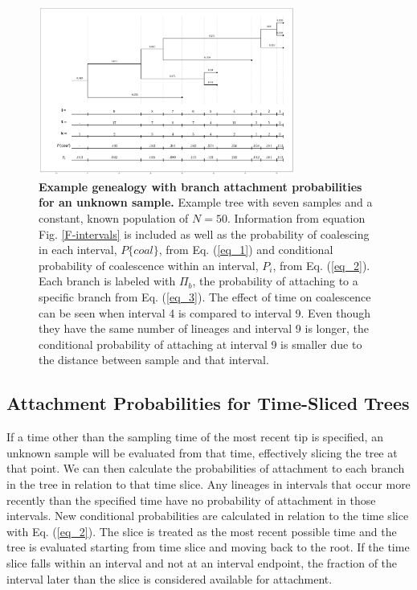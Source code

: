 \documentclass[11pt,oneside,letterpaper]{article}
\newcommand\tab[1][1cm]{\hspace*{#1}}
\begin{document}
\begin{figure}[h]
 \centering
	\includegraphics[width=0.75\textwidth]{figures/conditional-pcoal}
	\caption{\textbf{Example genealogy with branch attachment probabilities for an unknown sample.}
	Example tree with seven samples and a constant, known population of $N=50$. Information from equation Fig. \ref{F-intervals} is included as well as the probability of coalescing in each interval, $P\{coal\}$, from Eq. (\ref{eq_1}) and conditional probability of coalescence within an interval, $P_i$, from Eq. (\ref{eq_2}). Each branch is labeled with $\Pi_b$, the probability of attaching to a specific branch from Eq. (\ref{eq_3}). The effect of time on coalescence can be seen when interval 4 is compared to interval 9. Even though they have the same number of lineages and interval 9 is longer, the conditional probability of attaching at interval 9 is smaller due to the distance between sample and that interval.
	}
	\label{F-conditional-pcoal}
\end{figure}
\subsection*{Attachment Probabilities for Time-Sliced Trees}
\tab If a time other than the sampling time of the most recent tip is specified, an unknown sample will be evaluated from that time, effectively slicing the tree at that point. We can then calculate the probabilities of attachment to each branch in the tree in relation to that time slice. Any lineages in intervals that occur more recently than the specified time have no probability of attachment in those intervals. New conditional probabilities are calculated in relation to the time slice with Eq. (\ref{eq_2}). The slice is treated as the most recent possible time and the tree is evaluated starting from time slice and moving back to the root. If the time slice falls within an interval and not at an interval endpoint, the fraction of the interval later than the slice is considered available for attachment.
 
\end{document}
